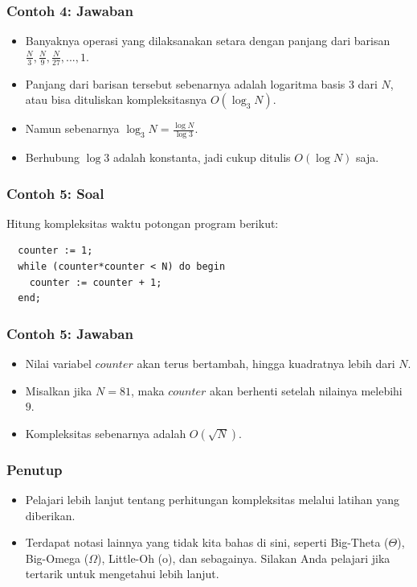 \begin{frame}
\frametitle{Contoh 4: Jawaban}
\begin{itemize}
  \item Banyaknya operasi yang dilaksanakan setara dengan panjang dari barisan $\frac{N}{3}, \frac{N}{9}, \frac{N}{27}, ..., 1$.
  \item Panjang dari barisan tersebut sebenarnya adalah logaritma basis 3 dari $N$, atau bisa dituliskan kompleksitasnya $O(\log_3{N})$.
  \item Namun sebenarnya $\log_3{N} = \frac{\log{N}}{\log{3}}$.
  \item Berhubung $\log{3}$ adalah konstanta, jadi cukup ditulis $O(\log{N})$ saja.
\end{itemize}
\end{frame}

\begin{frame}[fragile]
\frametitle{Contoh 5: Soal}
Hitung kompleksitas waktu potongan program berikut:

\hfill

\begin{lstlisting}
  counter := 1;
  while (counter*counter < N) do begin
    counter := counter + 1;
  end;
\end{lstlisting}
\end{frame}

\begin{frame}
\frametitle{Contoh 5: Jawaban}
\begin{itemize}
  \item Nilai variabel $counter$ akan terus bertambah, hingga kuadratnya lebih dari $N$.
  \item Misalkan jika $N = 81$, maka $counter$ akan berhenti setelah nilainya melebihi $9$.
  \item Kompleksitas sebenarnya adalah $O(\sqrt{N})$.
\end{itemize}
\end{frame}

\begin{frame}
\frametitle{Penutup}
\begin{itemize}
  \item Pelajari lebih lanjut tentang perhitungan kompleksitas melalui latihan yang diberikan.
  \item Terdapat notasi lainnya yang tidak kita bahas di sini, seperti Big-Theta ($\Theta$), Big-Omega ($\Omega$), Little-Oh (o), dan sebagainya. Silakan Anda pelajari jika tertarik untuk mengetahui lebih lanjut.
\end{itemize}
\end{frame}


